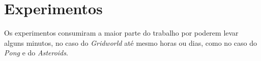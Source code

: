 %
%
%
%

\section{Experimentos}
\label{sec:exp}

Os experimentos consumiram a maior parte do trabalho por poderem levar alguns minutos, no caso do \textit{Gridworld} até mesmo horas ou dias, como no caso do \textit{Pong} e do \textit{Asteroids}.

